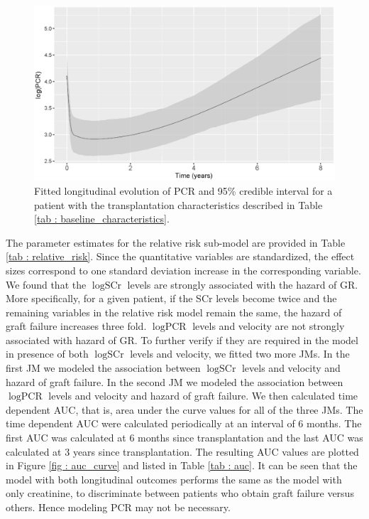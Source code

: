 \begin{figure}[!htb]
\centerline{\includegraphics[width=\columnwidth]{images/pcr.eps}}
\caption{Fitted longitudinal evolution of PCR and 95\% credible interval for a patient with the  transplantation characteristics described in Table \ref{tab : baseline_characteristics}.}
\label{fig : pcr_evolution}
\end{figure}

The parameter estimates for the relative risk sub-model are provided in Table \ref{tab : relative_risk}. Since the quantitative variables are standardized, the effect sizes correspond to one standard deviation increase in the corresponding variable. We found that the $\log \mbox{SCr}$  levels are strongly associated with the hazard of GR. More specifically, for a given patient, if the SCr levels become twice and the remaining variables in the relative risk model remain the same, the hazard of graft failure increases three fold. $\log \mbox{PCR}$ levels and velocity are not strongly associated with hazard of GR. To further verify if they are required in the model in presence of both $\log \mbox{SCr}$ levels and velocity, we fitted two more JMs. In the first JM we modeled the association between $\log \mbox{SCr}$ levels and velocity and hazard of graft failure. In the second JM we modeled the association between $\log \mbox{PCR}$ levels and velocity and hazard of graft failure. We then calculated time dependent AUC, that is, area under the curve \citep{landmarking2017,rizopoulosJMbayes} values for all of the three JMs. The time dependent AUC were calculated periodically at an interval of 6 months. The first AUC was calculated at 6 months since transplantation and the last AUC was calculated at 3 years since transplantation. The resulting AUC values are plotted in Figure \ref{fig : auc_curve} and listed in Table \ref{tab : auc}. It can be seen that the model with both longitudinal outcomes performs the same as the model with only creatinine, to discriminate between patients who obtain graft failure versus others. Hence modeling PCR may not be necessary.

